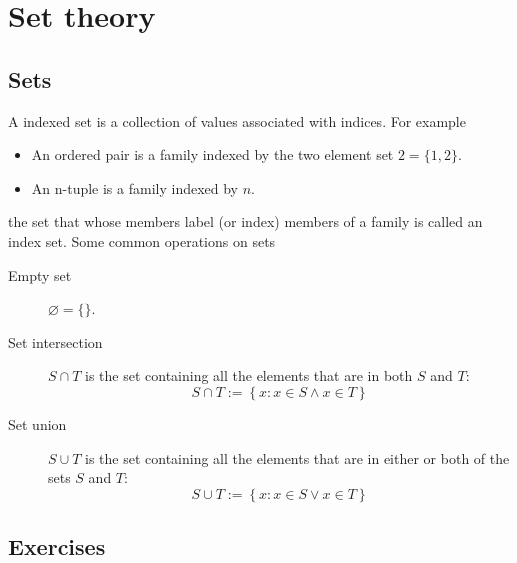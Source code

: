 \chapter{Set theory}

\section{Sets}
A indexed set is a collection of values associated with indices. For example
\begin{itemize}
\item An ordered pair is a family indexed by the two element set $2 = \{1, 2\}$.
\item An n-tuple is a family indexed by $n$.
\end{itemize}
the set that whose members label (or index) members of a family is called an index set. Some common operations on sets
\begin{description}
\item[Empty set] $\varnothing = \{\}$.
\item[Set intersection] $S \cap T$ is the set containing all the elements that are in both $S$ and $T$:
\begin{equation}
S \cap T := \left\{{x: x \in S \land x \in T}\right\}
\end{equation}
\item[Set union] $S \cup T$ is the set containing all the elements that are in either or both of the sets $S$ and $T$:
\begin{equation}
S \cup T := \left\{{x: x \in S \lor x \in T}\right\}
\end{equation}
\end{description}

\section{Exercises}
\begin{ExerciseList}
\end{ExerciseList}
